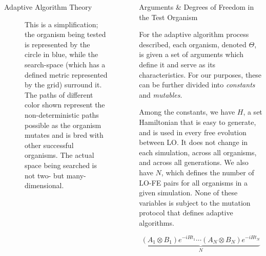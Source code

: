\documentclass[14pt]{beamer}
\begin{document}
\begin{frame}
\begin{columns}
\begin{column}{.45\textwidth}
\begin{block}{Adaptive Algorithm Theory}
\begin{figure}[htpb]
	\centering
		\caption{
		This is a simplification; the organism being tested is represented by the circle in blue, while the search-space (which has a defined metric represented by the grid) surround it. The paths of different color shown represent the non-deterministic paths possible as the organism mutates and is bred with other successful organisms. The actual space being searched is not two- but many-dimensional.
		}
	\end{figure} 
\end{block}
	
				
				\vspace{1em}
					\end{column}
			
			\begin{column}{.45\textwidth}
			
				\begin{block}{Arguments \& Degrees of Freedom in the Test Organism}


	For the adaptive algorithm process described, each organism, denoted $\Theta$, is given a set of arguments which define it and serve as its characteristics. For our purposes, these can be further divided into \emph{constants} and \emph{mutables}. 

	Among the constants, we have $H$, a set Hamiltonian that is easy to generate, and is used in every free evolution between LO. It does not change in each simulation, across all organisms, and across all generations. We also have $N$, which defines the number of LO-FE pairs for all organisms in a given simulation. None of these variables is subject to the mutation protocol that defines adaptive algorithms. 

	\begin{equation}
		\underbrace{  (A_1\otimes B_1)e^{-i H t_1}\cdots(A_{N}\otimes B_{N})e^{-i H t_{N}}}_{N}
	\end{equation}


\end{block}
\end{column}
\end{columns}
\end{frame}
\end{document}
